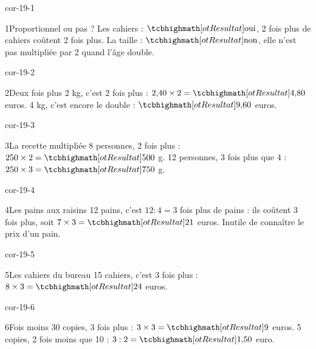 \clearpage\pagestyle{otMain}\setlength{\otBlocEspacement}{2.5mm}\fontsize{11}{15}\selectfont{}
\begin{blocLivre}{cor-19-1}\begin{corrige}{1}{Proportionnel ou pas ?}
Les cahiers : $\res{\text{oui}}$, 2 fois plus de cahiers coûtent 2 fois plus. La taille : $\res{\text{non}}$, elle n’est pas multipliée par 2 quand l’âge double.
\end{corrige}\end{blocLivre}
\begin{blocLivre}{cor-19-2}\begin{corrige}{2}{Deux fois plus}
2 kg, c’est 2 fois plus : $2{,}40\times2=\res{4{,}80}$ euros. 4 kg, c’est encore le double : $\res{9{,}60}$ euros.
\end{corrige}\end{blocLivre}
\begin{blocLivre}{cor-19-3}\begin{corrige}{3}{La recette multipliée}
8 personnes, 2 fois plus : $250\times2=\res{500}$ g. 12 personnes, 3 fois plus que 4 : $250\times3=\res{750}$ g.
\end{corrige}\end{blocLivre}
\begin{blocLivre}{cor-19-4}\begin{corrige}{4}{Les pains aux raisins}
12 pains, c’est $12:4=3$ fois plus de pains : ils coûtent 3 fois plus, soit $7\times3=\res{21}$ euros. Inutile de connaître le prix d’un pain.
\end{corrige}\end{blocLivre}
\begin{blocLivre}{cor-19-5}\begin{corrige}{5}{Les cahiers du bureau}
15 cahiers, c’est 3 fois plus : $8\times3=\res{24}$ euros.
\end{corrige}\end{blocLivre}
\begin{blocLivre}{cor-19-6}\begin{corrige}{6}{Fois moins}
30 copies, 3 fois plus : $3\times3=\res9$ euros. 5 copies, 2 fois moins que 10 : $3:2=\res{1{,}50}$ euro.
\end{corrige}\end{blocLivre}
